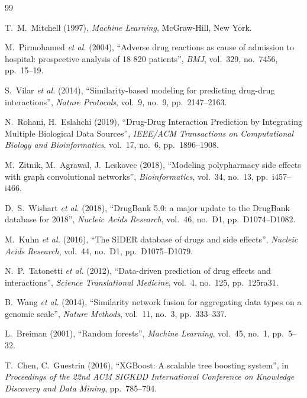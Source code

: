\documentclass[12pt,a4paper,oneside]{report}
\begin{document}
\begin{thebibliography}{99}
\setlength{\itemsep}{2pt}

T.~M.~Mitchell (1997), \textit{Machine Learning}, McGraw-Hill, New York.

M.~Pirmohamed \textit{et al.} (2004), ``Adverse drug reactions as cause of admission to hospital: prospective analysis of 18 820 patients'', \textit{BMJ}, vol.~329, no.~7456, pp.~15--19.

S.~Vilar \textit{et al.} (2014), ``Similarity-based modeling for predicting drug-drug interactions'', \textit{Nature Protocols}, vol.~9, no.~9, pp.~2147--2163.

N.~Rohani, H.~Eslahchi (2019), ``Drug-Drug Interaction Prediction by Integrating Multiple Biological Data Sources'', \textit{IEEE/ACM Transactions on Computational Biology and Bioinformatics}, vol.~17, no.~6, pp.~1896--1908.

M.~Zitnik, M.~Agrawal, J.~Leskovec (2018), ``Modeling polypharmacy side effects with graph convolutional networks'', \textit{Bioinformatics}, vol.~34, no.~13, pp.~i457--i466.

D.~S.~Wishart \textit{et al.} (2018), ``DrugBank 5.0: a major update to the DrugBank database for 2018'', \textit{Nucleic Acids Research}, vol.~46, no.~D1, pp.~D1074--D1082.

M.~Kuhn \textit{et al.} (2016), ``The SIDER database of drugs and side effects'', \textit{Nucleic Acids Research}, vol.~44, no.~D1, pp.~D1075--D1079.

N.~P.~Tatonetti \textit{et al.} (2012), ``Data-driven prediction of drug effects and interactions'', \textit{Science Translational Medicine}, vol.~4, no.~125, pp.~125ra31.

B.~Wang \textit{et al.} (2014), ``Similarity network fusion for aggregating data types on a genomic scale'', \textit{Nature Methods}, vol.~11, no.~3, pp.~333--337.

L.~Breiman (2001), ``Random forests'', \textit{Machine Learning}, vol.~45, no.~1, pp.~5--32.

T.~Chen, C.~Guestrin (2016), ``XGBoost: A scalable tree boosting system'', in \textit{Proceedings of the 22nd ACM SIGKDD International Conference on Knowledge Discovery and Data Mining}, pp.~785--794.


\end{thebibliography}
\end{document}
